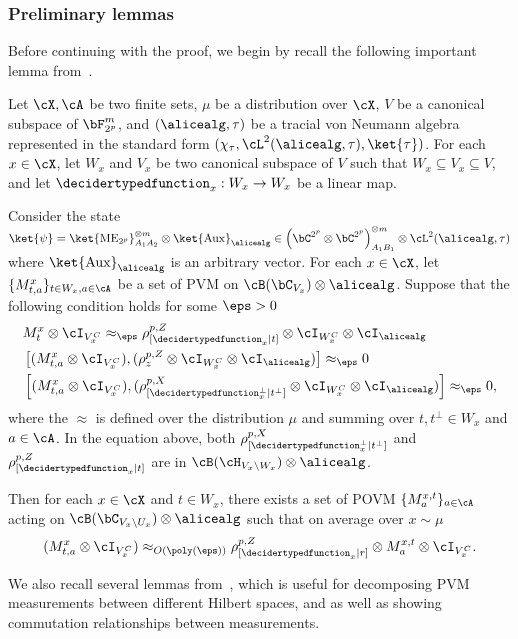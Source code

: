 \subsubsection{Preliminary lemmas}
Before continuing with the proof, we begin by recall the following important lemma from~\cite{jiMIPRE2022a}. 
\begin{lemma} \label{lem:PauliTwirl}
	Let $\cX, \cA$ be two finite sets, $\mu$ be a distribution over $\cX$, $V$ be a canonical subspace of $\bF_{2^p}^m$, and $(\alicealg, \tau)$ be a tracial von Neumann algebra represented in the standard form $(\chi_{\tau}, \cL^2(\alicealg, \tau), \ket{\tau})$. For each $x \in \cX$, let $W_x$ and $V_x$ be two canonical subspace of $V$ such that $W_x \subseteq V_x \subseteq V$, and let $\decidertypedfunction_x: W_x \rightarrow W_x$ be a linear map. 
	
	Consider the state $\ket{\psi} = \ket{\text{ME}_{2^{p}}}^{\otimes m}_{A_1 A_2} \otimes \ket{\text{Aux}}_{\alicealg} \in  \left(\bC^{2^{p }} \otimes \bC^{2^{p }} \right)_{A_1 B_1}^{\otimes m} \otimes \cL^2(\alicealg, \tau)$ where $\ket{\text{Aux}}_{\alicealg}$ is an arbitrary vector. For each $x \in \cX$, let $\{ M^{x}_{t, a}\}_{t \in W_x, a \in \cA}$ be a set of PVM on $\cB(\bC_{V_x}) \otimes \alicealg$. Suppose that the following condition holds for some $\eps > 0$
	\begin{align*}
		&M^{x}_{t} \otimes \cI_{V_x^C} \approx_{\eps} \rho_{[\decidertypedfunction_x | t]}^{p, Z} \otimes \cI_{W_x^C} \otimes \cI_\alicealg\\
		&\left[(M^{x}_{t, a} \otimes \cI_{V_x^C}),  (\rho_{z}^{p, Z} \otimes \cI_{W_x^C} \otimes \cI_\alicealg)\right] \approx_{\eps} 0 \\
		&\left[(M^{x}_{t, a} \otimes \cI_{V_x^C}),  (\rho_{[\decidertypedfunction^{\bot}_x| t^{\bot}]}^{p, X} \otimes \cI_{W_x^C} \otimes \cI_\alicealg) \right] \approx_{\eps} 0, 
	\end{align*}
	where the $\approx$ is defined over the distribution $\mu$ and summing over $t, t^{\bot} \in W_x$ and $a \in \cA$. In the equation above, both $\rho_{[\decidertypedfunction^{\bot}_x| t^{\bot}]}^{p, X}$ and $\rho_{[\decidertypedfunction_x | t]}^{p, Z}$ are in $\cB(\cH_{V_x \setminus W_x}) \otimes \alicealg$. 
	
	Then for each $x \in \cX$ and $t \in W_x$, there exists a set of POVM $\{M_a^{x,t}\}_{a \in \cA}$ acting on $\cB(\bC_{V_x \setminus U_x}) \otimes \alicealg$ such that on average over $x \sim \mu$
	\begin{equation*}
		(M_{t,a}^x \otimes \cI_{V_x^C}) \approx_{O(\poly(\eps))}   \rho_{[\decidertypedfunction_x | r]}^{p, Z} \otimes M_a^{x,t} \otimes \cI_{V_x^C}.
	\end{equation*}
\end{lemma}
We also recall several lemmas from~\cite[Section 8.4.2]{jiMIPRE2022a}, which is useful for decomposing PVM measurements between different Hilbert spaces, and as well as showing commutation relationships between measurements. 


